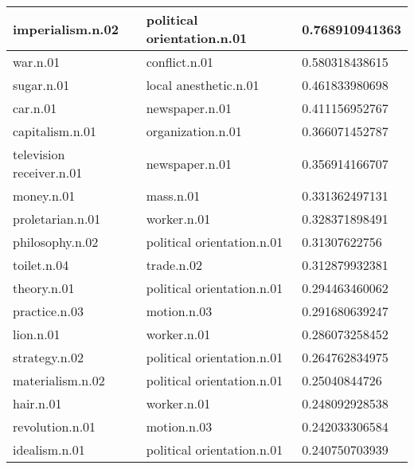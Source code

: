\begin{center}
\begin{tabular}{ | l | l | l |}
imperialism.n.02 & political orientation.n.01 & 0.768910941363 \\ \hline
war.n.01 & conflict.n.01 & 0.580318438615 \\ \hline
sugar.n.01 & local anesthetic.n.01 & 0.461833980698 \\ \hline
car.n.01 & newspaper.n.01 & 0.411156952767 \\ \hline
capitalism.n.01 & organization.n.01 & 0.366071452787 \\ \hline
television receiver.n.01 & newspaper.n.01 & 0.356914166707 \\ \hline
money.n.01 & mass.n.01 & 0.331362497131 \\ \hline
proletarian.n.01 & worker.n.01 & 0.328371898491 \\ \hline
philosophy.n.02 & political orientation.n.01 & 0.31307622756 \\ \hline
toilet.n.04 & trade.n.02 & 0.312879932381 \\ \hline
theory.n.01 & political orientation.n.01 & 0.294463460062 \\ \hline
practice.n.03 & motion.n.03 & 0.291680639247 \\ \hline
lion.n.01 & worker.n.01 & 0.286073258452 \\ \hline
strategy.n.02 & political orientation.n.01 & 0.264762834975 \\ \hline
materialism.n.02 & political orientation.n.01 & 0.25040844726 \\ \hline
hair.n.01 & worker.n.01 & 0.248092928538 \\ \hline
revolution.n.01 & motion.n.03 & 0.242033306584 \\ \hline
idealism.n.01 & political orientation.n.01 & 0.240750703939 \\ \hline
\end{tabular}
\end{center}